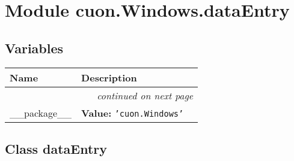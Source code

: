 %
%
%


\section{Module cuon.Windows.dataEntry}

    \label{cuon:Windows:dataEntry}


  \subsection{Variables}

    \vspace{-1cm}
\hspace{\varindent}\begin{longtable}{|p{\varnamewidth}|p{\vardescrwidth}|l}
\cline{1-2}
\cline{1-2} \centering \textbf{Name} & \centering \textbf{Description}& \\
\cline{1-2}
\endhead\cline{1-2}\multicolumn{3}{r}{\small\textit{continued on next page}}\\\endfoot\cline{1-2}
\endlastfoot\raggedright \_\-\_\-p\-a\-c\-k\-a\-g\-e\-\_\-\_\- & \raggedright \textbf{Value:} 
{\tt \texttt{'}\texttt{cuon.Windows}\texttt{'}}&\\
\cline{1-2}
\end{longtable}



\subsection{Class dataEntry}

